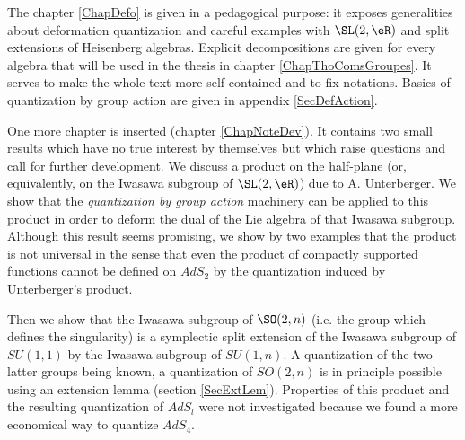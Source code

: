 The chapter \ref{ChapDefo} is given in a pedagogical purpose: it exposes generalities about deformation quantization and careful examples with $\SL(2,\eR)$ and split extensions of Heisenberg algebras. Explicit decompositions are given for every algebra that will be used in the thesis in chapter \ref{ChapThoComsGroupes}. It serves to make the whole text more self contained and to fix notations. Basics of quantization by group action are given in appendix \ref{SecDefAction}. 

One more chapter is inserted (chapter \ref{ChapNoteDev}). It contains two small results which have no true interest by themselves but which raise questions and call for further development. We discuss a product on the half-plane (or, equivalently, on the Iwasawa subgroup of $\SL(2,\eR)$) due to A. Unterberger. We show that the \emph{quantization by group action} machinery can be applied to this product in order to deform the dual of the Lie algebra of that Iwasawa subgroup. Although this result seems promising, we show by two examples that the product is not universal in the sense that even the product of compactly supported functions cannot be defined on $AdS_2$ by the quantization induced by Unterberger's product. 

 Then we show that the Iwasawa subgroup of $\SO(2,n)$ (i.e. the group which defines the singularity) is a symplectic split extension of the Iwasawa subgroup of $SU(1,1)$ by the Iwasawa subgroup of $SU(1,n)$. A quantization of the two latter groups being known, a quantization of $SO(2,n)$ is in principle possible using an extension lemma (section \ref{SecExtLem}). Properties of this product and the resulting quantization of $AdS_l$ were not investigated because we found a more economical way to quantize $AdS_4$.


